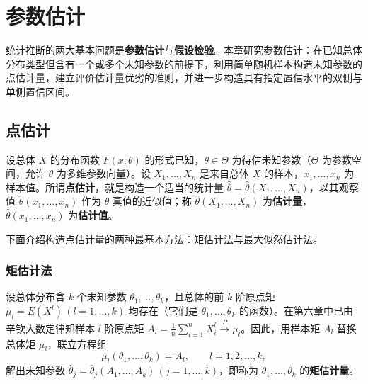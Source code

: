 %
%

\chapter{参数估计}
\label{ch:parameter-estimation}

统计推断的两大基本问题是\textbf{参数估计}与\textbf{假设检验}。本章研究参数估计：在已知总体分布类型但含有一个或多个未知参数的前提下，利用简单随机样本构造未知参数的点估计量，建立评价估计量优劣的准则，并进一步构造具有指定置信水平的双侧与单侧置信区间。

\section{点估计}
\label{sec:point-estimation}

设总体 $X$ 的分布函数 $F(x;\theta)$ 的形式已知，$\theta\in\Theta$ 为待估未知参数（$\Theta$ 为参数空间，允许 $\theta$ 为多维参数向量）。设 $X_1,\ldots,X_n$ 是来自总体 $X$ 的样本，$x_1,\ldots,x_n$ 为样本值。所谓\textbf{点估计}，就是构造一个适当的统计量 $\hat{\theta}=\hat{\theta}(X_1,\ldots,X_n)$，以其观察值 $\hat{\theta}(x_1,\ldots,x_n)$ 作为 $\theta$ 真值的近似值；称 $\hat{\theta}(X_1,\ldots,X_n)$ 为\textbf{估计量}，$\hat{\theta}(x_1,\ldots,x_n)$ 为\textbf{估计值}。

下面介绍构造点估计量的两种最基本方法：矩估计法与最大似然估计法。

\subsection{矩估计法}

设总体分布含 $k$ 个未知参数 $\theta_1,\ldots,\theta_k$，且总体的前 $k$ 阶原点矩 $\mu_l=E(X^l)\,(l=1,\ldots,k)$ 均存在（它们是 $\theta_1,\ldots,\theta_k$ 的函数）。在第六章中已由辛钦大数定律知样本 $l$ 阶原点矩 $A_l=\frac{1}{n}\sum_{i=1}^{n}X_i^l\xrightarrow{P}\mu_l$。因此，用样本矩 $A_l$ 替换总体矩 $\mu_l$，联立方程组
\begin{equation}
  \mu_l(\theta_1,\ldots,\theta_k)=A_l,\qquad l=1,2,\ldots,k,
  \label{eq:moment-equations}
\end{equation}
解出未知参数 $\hat{\theta}_j=\hat{\theta}_j(A_1,\ldots,A_k)\,(j=1,\ldots,k)$，即称为 $\theta_1,\ldots,\theta_k$ 的\textbf{矩估计量}。

